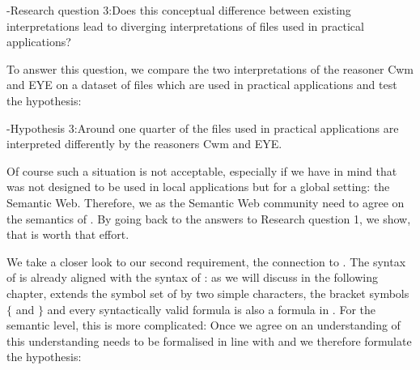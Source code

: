 \hyp{Research question 3:}{Does this conceptual difference between existing interpretations lead to diverging interpretations of files used in practical applications?} 

To answer this question, we compare the two interpretations of the reasoner Cwm and EYE on a dataset of \nthree files which are used in practical applications and 
test the hypothesis:

\hyp{Hypothesis 3:}{Around one quarter of the files used in practical applications are interpreted differently by the reasoners Cwm and EYE.}  

Of course such a situation is not acceptable, especially if we have in mind that \nthreelogic was not designed to be used in local applications but 
for a global setting: the Semantic Web. Therefore, we as the Semantic Web community need to agree on the semantics of \nthreelogic.  By going back to the answers to 
Research question 1, we show, that \nthreelogic is worth that effort.  


We take a closer look to our second requirement, the connection to \rdf. The syntax of \nthree is already aligned with the syntax of \rdf: 
as we will discuss in the following chapter, \nthree extends the symbol set of \rdf by two simple characters,
the bracket symbols $\{$ and $\}$ and every syntactically valid \rdf formula is also a formula in \nthree.  For the semantic level, this is more complicated: 
Once we agree on an understanding of \nthreelogic this understanding needs to be formalised in line with \rdf and we therefore formulate the hypothesis:


